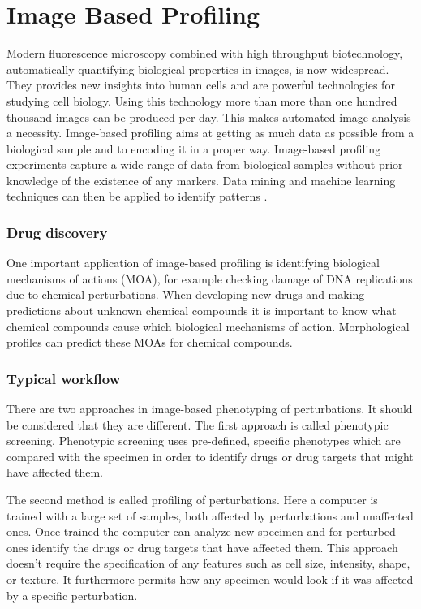 \chapter{Image Based Profiling}

Modern fluorescence microscopy combined with high throughput biotechnology, automatically quantifying biological properties in images, is now widespread. They provides new insights into human cells and are powerful technologies for studying cell biology. 
Using this technology more than more than 
one hundred thousand  images can be produced per day.
This makes automated image analysis a necessity. 
Image-based profiling aims at getting as much data 
as possible from a biological sample and to encoding
it in a proper way. Image-based profiling experiments capture a wide range of data
from biological samples without prior knowledge
of the existence of any markers.
Data mining and machine learning techniques can then be applied to identify patterns \cite{Jones} \cite{Scheeder2018}.

\subsection{Drug discovery}

One important application of image-based profiling is identifying biological mechanisms of actions (MOA),
for example checking damage of DNA replications due to chemical perturbations. 
When developing new drugs and making predictions about unknown
chemical compounds it is important to know what chemical compounds cause which biological mechanisms of action.
Morphological profiles can predict these MOAs for chemical compounds.

\subsection{Typical workflow}

There are two approaches in image-based phenotyping of perturbations. 
It should be considered that they are different.
The first approach is called phenotypic screening. 
Phenotypic screening uses pre-defined, specific phenotypes which are compared 
with the specimen in order to identify drugs or drug targets that might have affected 
them.

The second method is called profiling of perturbations. 
Here a computer is trained with a large set of samples, both
affected by perturbations and unaffected ones.
Once trained the computer can analyze new specimen 
and for perturbed ones identify the drugs or drug targets that have affected them.
This approach doesn't require the specification of any features such as cell size, intensity, shape, or texture.
It furthermore permits how any specimen would look if it was affected by a specific perturbation.


